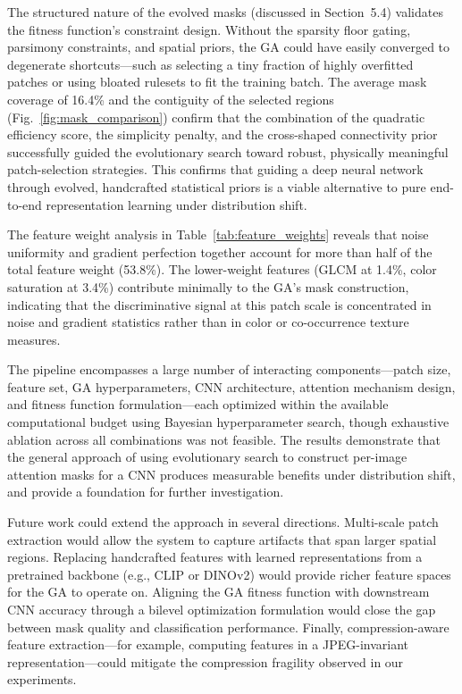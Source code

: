 \documentclass[runningheads]{llncs}
\begin{document}
The structured nature of the evolved masks (discussed in Section~5.4) validates the fitness function's constraint design. Without the sparsity floor gating, parsimony constraints, and spatial priors, the GA could have easily converged to degenerate shortcuts---such as selecting a tiny fraction of highly overfitted patches or using bloated rulesets to fit the training batch. The average mask coverage of 16.4\% and the contiguity of the selected regions (Fig.~\ref{fig:mask_comparison}) confirm that the combination of the quadratic efficiency score, the simplicity penalty, and the cross-shaped connectivity prior successfully guided the evolutionary search toward robust, physically meaningful patch-selection strategies. This confirms that guiding a deep neural network through evolved, handcrafted statistical priors is a viable alternative to pure end-to-end representation learning under distribution shift.

The feature weight analysis in Table~\ref{tab:feature_weights} reveals that noise uniformity and gradient perfection together account for more than half of the total feature weight (53.8\%). The lower-weight features (GLCM at 1.4\%, color saturation at 3.4\%) contribute minimally to the GA's mask construction, indicating that the discriminative signal at this patch scale is concentrated in noise and gradient statistics rather than in color or co-occurrence texture measures.

The pipeline encompasses a large number of interacting components---patch size, feature set, GA hyperparameters, CNN architecture, attention mechanism design, and fitness function formulation---each optimized within the available computational budget using Bayesian hyperparameter search, though exhaustive ablation across all combinations was not feasible. The results demonstrate that the general approach of using evolutionary search to construct per-image attention masks for a CNN produces measurable benefits under distribution shift, and provide a foundation for further investigation.

Future work could extend the approach in several directions. Multi-scale patch extraction would allow the system to capture artifacts that span larger spatial regions. Replacing handcrafted features with learned representations from a pretrained backbone (e.g., CLIP or DINOv2) would provide richer feature spaces for the GA to operate on. Aligning the GA fitness function with downstream CNN accuracy through a bilevel optimization formulation would close the gap between mask quality and classification performance. Finally, compression-aware feature extraction---for example, computing features in a JPEG-invariant representation---could mitigate the compression fragility observed in our experiments.
\end{document}
